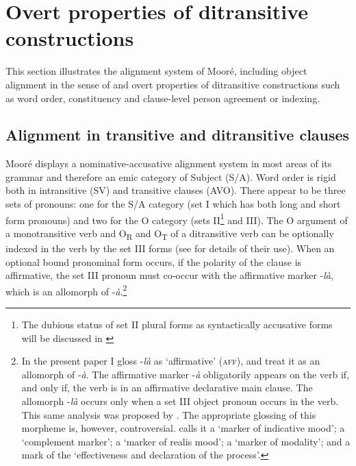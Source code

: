 \documentclass[output=paper]{langsci/langscibook}
\begin{document}
\section{Overt properties of ditransitive constructions}\label{§4:overt.pacchiarotti}

This section illustrates the alignment system of Mooré, including object alignment in the sense of \citet{malchukovetal2010} and overt properties of ditransitive constructions such as word order, constituency and clause-level person agreement or indexing.

\subsection{Alignment in transitive and ditransitive clauses}\label{§4.1:alignment.pacchiarotti}

Mooré displays a nominative-accusative alignment system in most areas of its grammar and therefore an emic category of Subject (S/A). Word order is rigid both in intransitive (SV) and transitive clauses (AVO). There appear to be three sets of pronouns: one for the S/A category (set I which has both long and short form pronouns) and two for the O category (sets II\footnote{The dubious status of set II plural forms as syntactically accusative forms will be discussed in \label{§4.3:split.pacchiarotti}} and III). The O argument of a monotransitive verb and O\textsubscript{R} and O\textsubscript{T} of a ditransitive verb can be optionally indexed in the verb by the set III forms (see  for details of their use). When an optional bound pronominal form occurs, if the polarity of the clause is affirmative, the set III pronoun must co-occur with the affirmative marker -\textit{là}, which is an allomorph of -\textit{à}.\footnote{In the present paper I gloss -\textit{là} as `affirmative' (\textsc{aff}), and treat it as an allomorph of -\textit{à}. The affirmative marker -\textit{à} obligatorily appears on the verb if, and only if, the verb is in an affirmative declarative main clause. The allomorph -\textit{là} occurs only when a set III object pronoun occurs in the verb. This same analysis was proposed by \citet{manessy1963}. The appropriate glossing of this morpheme is, however, controversial. \citet[96]{alexandre1953} calls it a `marker of indicative mood'; \citet[112]{peterson1971} a `complement marker'; \citet{canu1974} a `marker of realis mood'; \citet{Kabore1985} a `marker of modality'; and \citet{nikiema2003} a mark of the `effectiveness and declaration of the process'.} 
\end{document}
